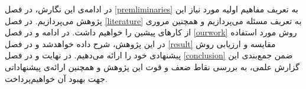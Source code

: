 در ادامه‌ی این نگارش،  در فصل
\ref{premliminaries}
به تعریف مفاهیم اولیه مورد نیاز این پژوهش می‌پردازیم. در فصل
\ref{literature}
به تعریف مسئله می‌پردازیم و همچنین مروری از کار‌های پیشین را خواهیم داشت.
در ادامه و در فصل
\ref{ourwork}
 روش مورد استفاده در این پژوهش، شرح داده خواهد‌شد  و در فصل
\ref{result}
مقایسه و ارزیابی روش پیشنهادی خود‌ را ارائه می‌دهیم. در نهایت و در فصل
\ref{conclusion}
ضمن جمع‌بندی این گزارش علمی، به بررسی نقاط ضعف و قوت این پژوهش و همچنین ارائه‌ی پیشنهاداتی جهت بهبود آن خواهیم‌پرداخت.


